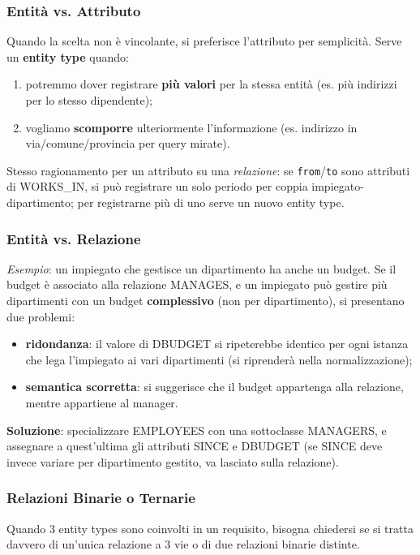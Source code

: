 \documentclass[12pt, a4paper]{article}
\begin{document}
\subsubsection{Entità vs. Attributo}
Quando la scelta non è vincolante, si preferisce l'attributo per semplicità. Serve un \textbf{entity type} quando:
\begin{enumerate}
    \item potremmo dover registrare \textbf{più valori} per la stessa entità (es. più indirizzi per lo stesso dipendente);
    \item vogliamo \textbf{scomporre} ulteriormente l'informazione (es. indirizzo in via/comune/provincia per query mirate).
\end{enumerate}
Stesso ragionamento per un attributo su una \emph{relazione}: se \texttt{from}/\texttt{to} sono attributi di WORKS\_IN, si può registrare un solo periodo per coppia impiegato-dipartimento; per registrarne più di uno serve un nuovo entity type.

\subsubsection{Entità vs. Relazione}
\label{sec:entita-o-relazione}
\textit{Esempio}: un impiegato che gestisce un dipartimento ha anche un budget. Se il budget è associato alla relazione MANAGES, e un impiegato può gestire più dipartimenti con un budget \textbf{complessivo} (non per dipartimento), si presentano due problemi:
\begin{itemize}
    \item \textbf{ridondanza}: il valore di DBUDGET si ripeterebbe identico per ogni istanza che lega l'impiegato ai vari dipartimenti (si riprenderà nella normalizzazione);
    \item \textbf{semantica scorretta}: si suggerisce che il budget appartenga alla relazione, mentre appartiene al manager.
\end{itemize}
\textbf{Soluzione}: specializzare EMPLOYEES con una sottoclasse MANAGERS, e assegnare a quest'ultima gli attributi SINCE e DBUDGET (se SINCE deve invece variare per dipartimento gestito, va lasciato sulla relazione).

\subsubsection{Relazioni Binarie o Ternarie}
Quando 3 entity types sono coinvolti in un requisito, bisogna chiedersi se si tratta davvero di un'unica relazione a 3 vie o di due relazioni binarie distinte.
\end{document}
